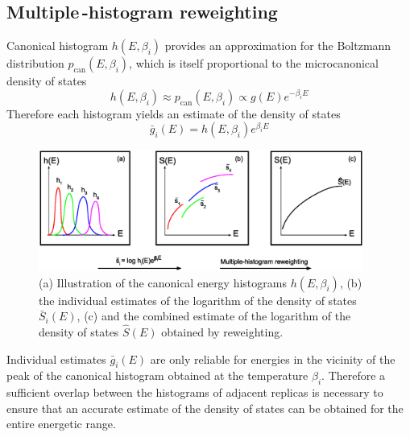 \documentclass[12pt]{report}
\begin{document}
\subsection{Multiple\,-histogram reweighting}
Canonical histogram $h(E,\beta_{i})$ provides an approximation for the Boltzmann distribution $p_{\mathrm{can}}(E, \beta_{i})$, which is itself proportional to the microcanonical density of states
%
\begin{equation}
\label{eq:canonicalDistribution}
h(E,\beta_{i}) \approx p_{\mathrm{can}}(E, \beta_{i}) \propto g(E)e^{-\beta_{i}E}
\end{equation}
%
Therefore each histogram yields an estimate of the density of states 
%
\begin{equation}
\label{eq:singleHistogramReweighting}
\bar{g}_{i}(E) = h(E,\beta_{i})e^{\beta _{i} E}
\end{equation}
%
%
\begin{figure}
\center
\includegraphics[width = 0.95\textwidth]{chapter3Figs/multipleHistogramReweighting.eps}
\caption{\label{fig:MHR}%
(a) Illustration of the canonical energy histograms $h(E,\beta_{i})$, (b) the individual estimates of the logarithm of the density of states $\bar{S}_{i}(E)$, (c) and the combined estimate of the logarithm of the density of states $\hat{S}(E)$ obtained by reweighting.}
\end{figure}
% 
Individual estimates $\bar{g}_{i}(E)$ are only reliable for energies in the
vicinity of the peak of the canonical histogram obtained at the temperature
$\beta _{i}$. Therefore a sufficient overlap between the histograms of
adjacent replicas is necessary to ensure that an accurate estimate of the density of states can be obtained for the entire energetic range. 
\end{document}
